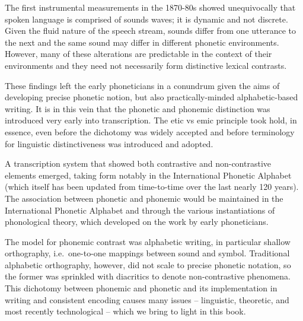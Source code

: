 

The first instrumental measurements in the 1870-80s showed unequivocally that spoken language is comprised of sounds waves; it is dynamic and not discrete. Given the fluid nature of the speech stream, sounds differ from one utterance to the next and the same sound may differ in different phonetic environments. However, many of these alterations are predictable in the context of their environments and they need not necessarily form distinctive lexical contrasts.

These findings left the early phoneticians in a conundrum given the aims of developing precise phonetic notion, but also practically-minded alphabetic-based writing. It is in this vein that the phonetic and phonemic distinction was introduced very early into transcription. The etic vs emic principle took hold, in essence, even before the dichotomy was widely accepted and before terminology for linguistic distinctiveness was introduced and adopted.

A transcription system that showed both contrastive and non-contrastive elements emerged, taking form notably in the International Phonetic Alphabet (which itself has been updated from time-to-time over the last nearly 120 years). The association between phonetic and phonemic would be maintained in the International Phonetic Alphabet and through the various instantiations of phonological theory, which developed on the work by early phoneticians.

The model for phonemic contrast was alphabetic writing, in particular shallow orthography, i.e.\ one-to-one mappings between sound and symbol. Traditional alphabetic orthography, however, did not scale to precise phonetic notation, so the former was sprinkled with diacritics to denote non-contrastive phenomena. This dichotomy between phonemic and phonetic and its implementation in writing and consistent encoding causes many issues -- linguistic, theoretic, and most recently technological -- which we bring to light in this book.
